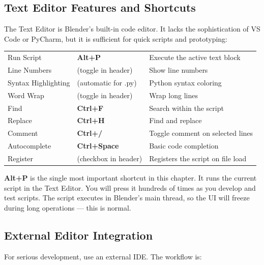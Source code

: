 \subsection{Text Editor Features and Shortcuts}

The Text Editor is Blender's built-in code editor. It lacks the sophistication of VS Code or PyCharm, but it is sufficient for quick scripts and prototyping:

\begin{center}
\begin{tabularx}{\textwidth}{L{3cm}L{2.5cm}X}
\toprule
{}
 &  &  \\
\midrule
Run Script & \textbf{Alt+P} & Execute the active text block \\
Line Numbers & (toggle in header) & Show line numbers \\
Syntax Highlighting & (automatic for .py) & Python syntax coloring \\
Word Wrap & (toggle in header) & Wrap long lines \\
Find & \textbf{Ctrl+F} & Search within the script \\
Replace & \textbf{Ctrl+H} & Find and replace \\
Comment & \textbf{Ctrl+/} & Toggle comment on selected lines \\
Autocomplete & \textbf{Ctrl+Space} & Basic code completion \\
Register & (checkbox in header) & Registers the script on file load \\
\bottomrule
\end{tabularx}
\end{center}

\begin{shortcutbox}
\textbf{Alt+P} is the single most important shortcut in this chapter. It runs the current script in the Text Editor. You will press it hundreds of times as you develop and test scripts. The script executes in Blender's main thread, so the UI will freeze during long operations --- this is normal.
\end{shortcutbox}

\subsection{External Editor Integration}

For serious development, use an external IDE. The workflow is:

